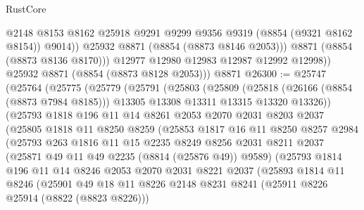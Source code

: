 \begin{lexlean}{RustCore}
\begin{coremodule}
                  @2148
                  @8153
                  @8162
                  @25918
                  @9291
                  @9299
                  @9356
                  @9319
                  (@8854 (@9321 @8162 @8154))
                  @9014))
              @25932
              @8871
              (@8854 (@8873 @8146 @2053)))
            @8871
            (@8854 (@8873 @8136 @8170)))
          @12977
          @12980
          @12983
          @12987
          @12992
          @12998))
      @25932
      @8871
      (@8854 (@8873 @8128 @2053)))
    @8871
@26300 := @25747
    (@25764
      (@25775
        (@25779
          (@25791
            (@25803
              (@25809
                (@25818
                  (@26166 (@8854 (@8873 @7984 @8185)))
                  @13305
                  @13308
                  @13311
                  @13315
                  @13320
                  @13326))
              (@25793
                @1818
                @196
                @11
                @14
                @8261
                @2053
                @2070
                @2031
                @8203
                @2037
                (@25805
                  @1818
                  @11
                  @8250
                  @8259
                  (@25853
                    @1817
                    @16
                    @11
                    @8250
                    @8257
                    @2984
                    (@25793
                      @263
                      @1816
                      @11
                      @15
                      @2235
                      @8249
                      @8256
                      @2031
                      @8211
                      @2037
                      (@25871 @49 @11 @49 @2235 (@8814 (@25876 @49)) @9589)
                      (@25793
                        @1814
                        @196
                        @11
                        @14
                        @8246
                        @2053
                        @2070
                        @2031
                        @8221
                        @2037
                        (@25893
                          @1814
                          @11
                          @8246
                          (@25901
                            @49
                            @18
                            @11
                            @8226
                            @2148
                            @8231
                            @8241
                            (@25911 @8226 @25914 (@8822 (@8823 @8226)))

\end{coremodule}
\end{lexlean}
